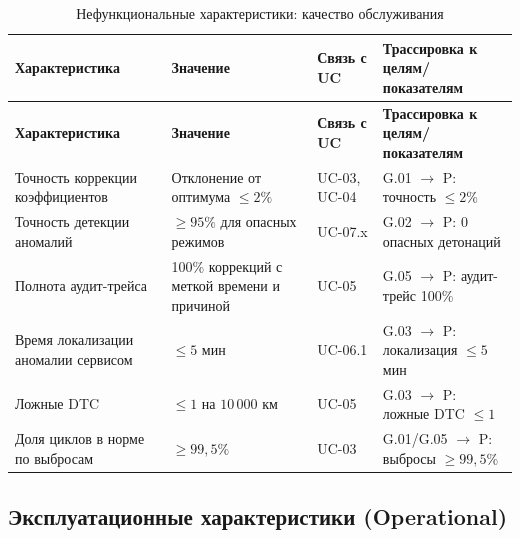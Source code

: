 \documentclass[14pt, a4paper]{extarticle}
\begin{document}
				\begin{xltabular}{\textwidth}{|L|L|L|L|}
					\caption{Нефункциональные характеристики: качество обслуживания}\label{tab:nfr-qos}\\
					\hline
					\textbf{Характеристика} & \textbf{Значение} & \textbf{Связь с UC} & \textbf{Трассировка к целям/показателям} \\
					\hline
					\endfirsthead
					\hline
					\textbf{Характеристика} & \textbf{Значение} & \textbf{Связь с UC} & \textbf{Трассировка к целям/показателям} \\
					\hline
					\endhead
					\hline
					\endfoot
					\hline
					\endlastfoot
					Точность коррекции коэффициентов & Отклонение от оптимума \(\leq 2\%\) & UC-03, UC-04 & G.01 \(\to\) P: точность \(\leq 2\%\) \\
					\hline
					Точность детекции аномалий & \(\geq 95\%\) для опасных режимов & UC-07.x & G.02 \(\to\) P: 0 опасных детонаций \\
					\hline
					Полнота аудит-трейса & 100\% коррекций с меткой времени и причиной & UC-05 & G.05 \(\to\) P: аудит-трейс 100\% \\
					\hline
					Время локализации аномалии сервисом & \(\leq 5\) мин & UC-06.1 & G.03 \(\to\) P: локализация \(\leq 5\) мин \\
					\hline
					Ложные DTC & \(\leq 1\) на \(10\,000\) км & UC-05 & G.03 \(\to\) P: ложные DTC \(\leq 1\) \\
					\hline
					Доля циклов в норме по выбросам & \(\geq 99{,}5\%\) & UC-03 & G.01/G.05 \(\to\) P: выбросы \(\geq 99{,}5\%\) \\
					\hline
				\end{xltabular}
				
				\subsection{Эксплуатационные характеристики (Operational)}
				
\end{document}
